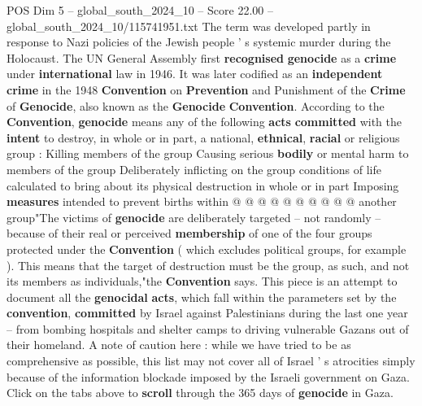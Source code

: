 \begin{textsample}{POS Dim 5 – global\_south\_2024\_10 – Score 22.00 – global\_south\_2024\_10/115741951.txt}
The term was developed partly in response to Nazi policies of the Jewish people ' s systemic murder during the Holocaust.
The UN General Assembly first \textbf{recognised} \textbf{genocide} as a \textbf{crime} under \textbf{international} law in 1946.
It was later codified as an \textbf{independent} \textbf{crime} in the 1948 \textbf{Convention} on \textbf{Prevention} and Punishment of the \textbf{Crime} of \textbf{Genocide}, also known as the \textbf{Genocide} \textbf{Convention}.
According to the \textbf{Convention}, \textbf{genocide} means any of the following \textbf{acts} \textbf{committed} with the \textbf{intent} to destroy, in whole or in part, a national, \textbf{ethnical}, \textbf{racial} or religious group : Killing members of the group Causing serious \textbf{bodily} or mental harm to members of the group Deliberately inflicting on the group conditions of life calculated to bring about its physical destruction in whole or in part Imposing \textbf{measures} intended to prevent births within @ @ @ @ @ @ @ @ @ @ another group"The victims of \textbf{genocide} are deliberately targeted -- not randomly -- because of their real or perceived \textbf{membership} of one of the four groups protected under the \textbf{Convention} ( which excludes political groups, for example ).
This means that the target of destruction must be the group, as such, and not its members as individuals,"the \textbf{Convention} says.
This piece is an attempt to document all the \textbf{genocidal} \textbf{acts}, which fall within the parameters set by the \textbf{convention}, \textbf{committed} by Israel against Palestinians during the last one year -- from bombing hospitals and shelter camps to driving vulnerable Gazans out of their homeland.
A note of caution here : while we have tried to be as comprehensive as possible, this list may not cover all of Israel ' s atrocities simply because of the information blockade imposed by the Israeli government on Gaza.
Click on the tabs above to \textbf{scroll} through the 365 days of \textbf{genocide} in Gaza.

\end{textsample}
